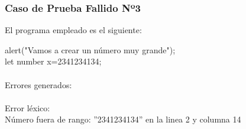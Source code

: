 \documentclass{article}
\begin{document}
\subsubsection{Caso de Prueba Fallido Nº3}
\begin{center} 
El programa empleado es el siguiente:
\end{center}
\begin{flushleft}
alert("Vamos a crear un número muy grande");\\
let number x=2341234134;\\
\quad\\
Errores generados:\\
\quad\\
Error léxico: \\
	\qquad Número fuera de rango: ''2341234134'' en la linea 2 y columna 14
	\end{flushleft}
\clearpage
\end{document}
